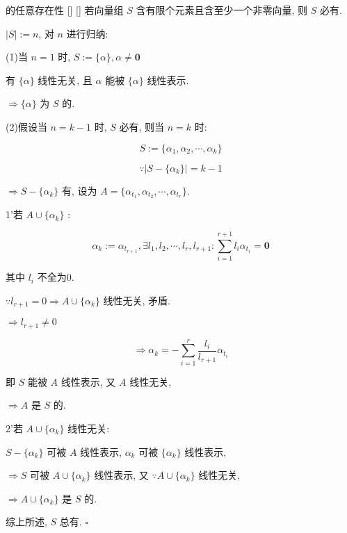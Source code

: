 \documentclass[UTF8]{ctexart}
\DeclareMathOperator{\0}{\mathbf{0}}
\DeclareMathOperator{\<}{\langle}
\renewcommand{\>}{\rangle}
\begin{document}
		\begin{ppt}
			[]
			{ 的任意存在性}
			[]
			[]
			若向量组 \(S\) 含有限个元素且含至少一个非零向量, 则 \(S\) 必有. 
			
		\end{ppt}
		\begin{prf}
		
			 \(|S|:=n\), 对 \(n\) 进行归纳: 
			
			(1)当 \(n=1\) 时,  \(S:=\{\alpha\}, \alpha \neq \mathbf{0}\) 
			
			有 \(\{\alpha\}\) 线性无关, 且 \(\alpha\) 能被 \(\{\alpha\}\) 线性表示. 
			
			 \(\Longrightarrow\{\alpha\}\) 为 \(S\) 的. 
			
			(2)假设当 \(n=k-1\) 时,  \(S\) 必有, 则当 \(n=k\) 时: 
			
			\[S:=\{\alpha_{1}, \alpha_{2}, \cdots, \alpha_{k}\}\]
			
			\[\because|S-\{\alpha_{k}\}|=k-1\]
			
			 \(\Longrightarrow S-\{\alpha_{k}\}\) 有, 设为 \(A=\{\alpha_{t_{1}}, \alpha_{t_{2}}, \cdots, \alpha_{t_{r}}\}\). 
			
			1'若 \(A\cup \{\alpha_{k}\}\)  : 
			
			\[\alpha_{k}:=\alpha_{t_{r+1}},\exists l_{1},l_{2},\cdots,l_{r},l_{r+1}: \sum_{i=1}^{r+1}l_{i}\alpha_{t_{i}}=\mathbf{0}\]
			
			其中 \(l_{i}\) 不全为0. 
			
			 \(\because l_{r+1}=0\Longrightarrow A\cup \{\alpha_{k}\}\) 线性无关, 矛盾. 
			
			 \(\Longrightarrow l_{r+1}\neq 0\) 
			
			\[\Longrightarrow\alpha_{k}=-\sum_{i=1}^{r}\frac{l_{i}}{l_{r+1}}\alpha_{t_{i}}\]
			
			即 \(S\) 能被 \(A\) 线性表示, 又 \(A\) 线性无关, 
			
			 \(\Longrightarrow A\) 是 \(S\) 的. 
			
			2'若 \(A\cup \{\alpha_{k}\}\) 线性无关:
			
			 \(S-\{\alpha_{k}\}\) 可被 \(A\) 线性表示,  \(\alpha_{k}\) 可被 \(\{\alpha_{k}\}\) 线性表示, 
			
			 \(\Longrightarrow S\) 可被 \(A\cup \{\alpha_{k}\}\) 线性表示, 又 \(\because A\cup \{\alpha_{k}\}\) 线性无关, 
			
			 \(\Longrightarrow A\cup \{\alpha_{k}\}\) 是 \(S\) 的. 
			
			综上所述,  \(S\) 总有.  \(\square\) 
		\end{prf}
  
\end{document}
